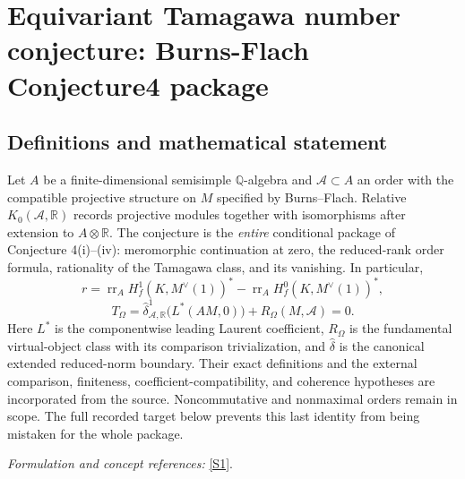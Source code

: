 \documentclass[11pt,a4paper]{article}
\newcommand{\Q}{\mathbb{Q}}
\newcommand{\R}{\mathbb{R}}
\newcommand{\sref}[2]{\hyperlink{source:#1:#2}{[S#2]}}
\numberwithin{equation}{section}
\begin{document}
\setcounter{section}{0}
\clearpage
\section*{\texorpdfstring{Equivariant Tamagawa number conjecture: Burns-Flach Conjecture4 package}{Equivariant Tamagawa number conjecture: Burns-Flach Conjecture4 package}}\label{statement}
\subsection{Definitions and mathematical statement}
Let $A$ be a finite-dimensional semisimple $\Q$-algebra and $\mathcal A\subset A$ an order with the compatible projective structure on $M$ specified by Burns--Flach. Relative $K_0(\mathcal A,\R)$ records projective modules together with isomorphisms after extension to $A\otimes\R$. The conjecture is the \emph{entire} conditional package of Conjecture 4(i)--(iv): meromorphic continuation at zero, the reduced-rank order formula, rationality of the Tamagawa class, and its vanishing. In particular,
\[
 r=\operatorname{rr}_A H_f^1(K,M^\vee(1))^*
   -\operatorname{rr}_A H_f^0(K,M^\vee(1))^*,
\]
\[
 T_\Omega=\widehat\delta^1_{\mathcal A,\R}\bigl(L^*(AM,0)\bigr)
             +R_\Omega(M,\mathcal A)=0.
\]
Here $L^*$ is the componentwise leading Laurent coefficient, $R_\Omega$ is the fundamental virtual-object class with its comparison trivialization, and $\widehat\delta$ is the canonical extended reduced-norm boundary. Their exact definitions and the external comparison, finiteness, coefficient-compatibility, and coherence hypotheses are incorporated from the source. Noncommutative and nonmaximal orders remain in scope. The full recorded target below prevents this last identity from being mistaken for the whole package.
\par\smallskip\textit{Formulation and concept references:} \sref{statement}{1}.
\end{document}
